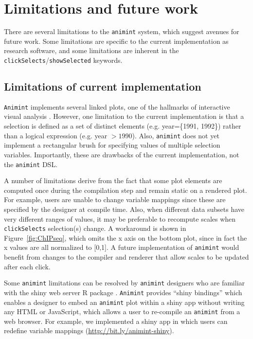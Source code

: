 \documentclass[journal]{vgtc}\usepackage[]{graphicx}\usepackage[]{color}
\begin{document}

\section{Limitations and future work}


There are several limitations to the \texttt{animint} system, which suggest
avenues for future work. Some limitations are specific to the current
implementation as research software, and some limitations are inherent
in the \texttt{clickSelects}/\texttt{showSelected} keywords.

\subsection{Limitations of current implementation}

\texttt{Animint} implements several linked plots, one of the hallmarks of
interactive visual analysis \citep{iva}. However, one limitation to
the current implementation is that a selection is defined as a set of
distinct elements (e.g. year=\{1991, 1992\}) rather than a logical
expression (e.g. year $>1990$). Also, \texttt{animint} does not yet
implement a rectangular brush for specifying values of
multiple selection variables.
Importantly, these are drawbacks of the
current implementation, not the \texttt{animint} DSL.

A number of limitations derive from the fact that some plot elements
are computed once during the compilation step and remain static on a
rendered plot. For example, users are unable to change variable
mappings since these are specified by the designer at compile
time. Also, when different data subsets have very different ranges of
values, it may be preferable to recompute scales when
\texttt{clickSelects} selection(s) change. A workaround is shown in
Figure~\ref{fig:ChIPseq}, which omits the x axis on the bottom plot,
since in fact the x values are all normalized to [0,1]. A future
implementation of \texttt{animint} would benefit from changes to the compiler
and renderer that allow scales to be updated after each click.

Some \texttt{animint} limitations can be resolved by \texttt{animint} designers who are
familiar with the shiny web server R package \citep{shiny}.  \texttt{Animint}
provides ``shiny bindings'' which enables a designer to embed an
\texttt{animint} plot within a shiny app without writing any HTML or
JavaScript, which allows a user to re-compile an \texttt{animint} from a web
browser. For example, we implemented a shiny app in which users can
redefine variable mappings (\url{http://bit.ly/animint-shiny}).
\end{document}
